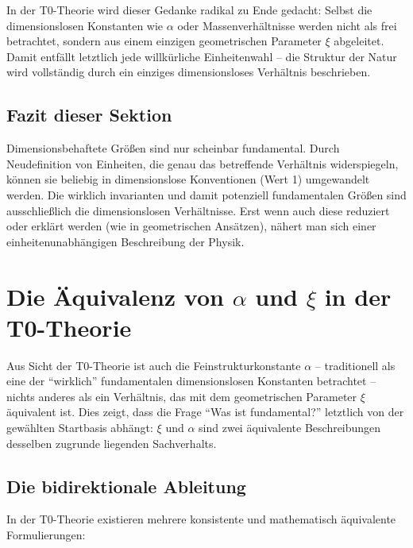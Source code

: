 In der T0-Theorie wird dieser Gedanke radikal zu Ende gedacht: Selbst die dimensionslosen Konstanten wie $\alpha$ oder Massenverhältnisse werden nicht als frei betrachtet, sondern aus einem einzigen geometrischen Parameter $\xi$ abgeleitet. Damit entfällt letztlich jede willkürliche Einheitenwahl – die Struktur der Natur wird vollständig durch ein einziges dimensionsloses Verhältnis beschrieben.

\subsection{Fazit dieser Sektion}

Dimensionsbehaftete Größen sind nur scheinbar fundamental. Durch Neudefinition von Einheiten, die genau das betreffende Verhältnis widerspiegeln, können sie beliebig in dimensionslose Konventionen (Wert 1) umgewandelt werden. Die wirklich invarianten und damit potenziell fundamentalen Größen sind ausschließlich die dimensionslosen Verhältnisse. Erst wenn auch diese reduziert oder erklärt werden (wie in geometrischen Ansätzen), nähert man sich einer einheitenunabhängigen Beschreibung der Physik.

\section{Die Äquivalenz von \(\alpha\) und \(\xi\) in der T0-Theorie}

Aus Sicht der T0-Theorie ist auch die Feinstrukturkonstante \(\alpha\) – traditionell als eine der ``wirklich'' fundamentalen dimensionslosen Konstanten betrachtet – nichts anderes als ein Verhältnis, das mit dem geometrischen Parameter \(\xi\) äquivalent ist. Dies zeigt, dass die Frage ``Was ist fundamental?'' letztlich von der gewählten Startbasis abhängt: \(\xi\) und \(\alpha\) sind zwei äquivalente Beschreibungen desselben zugrunde liegenden Sachverhalts.

\subsection{Die bidirektionale Ableitung}

In der T0-Theorie existieren mehrere konsistente und mathematisch äquivalente Formulierungen:

